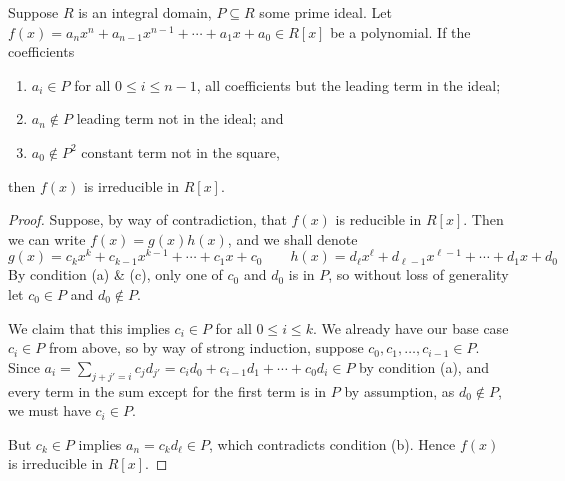 \begin{theorem}\label{thm:eisenstein-criterion}
    Suppose \(R\) is an integral domain, \(P \subseteq R\) some prime ideal.
    Let \(f(x) = a_n x^n + a_{n-1}x^{n-1} + \cdots + a_1 x + a_0 \in R[x]\)
    be a polynomial.
    If the coefficients
    \begin{enumerate}[label={(\alph*)}, itemsep=0mm]
        \item \(a_i \in P\) for all \(0 \leq i \leq n-1\),
            all coefficients but the leading term in the ideal;
        \item \(a_n \notin P\) leading term not in the ideal; and
        \item \(a_0 \notin P^2\) constant term not in the square,
    \end{enumerate}
    then \(f(x)\) is irreducible in \(R[x]\).
\end{theorem}
\begin{proof}
    Suppose, by way of contradiction, that \(f(x)\) is reducible in \(R[x]\).
    Then we can write \(f(x) = g(x)h(x)\), and we shall denote
    \begin{equation*}
        g(x) = c_k x^k + c_{k-1}x^{k-1} + \cdots + c_1 x + c_0 \qquad
        h(x) = d_\ell x^\ell + d_{\ell-1}x^{\ell-1} + \cdots + d_1 x + d_0
    \end{equation*}
    By condition (a) \& (c),
    only one of \(c_0\) and \(d_0\) is in \(P\),
    so without loss of generality let \(c_0 \in P\) and \(d_0 \notin P\).

    We claim that this implies \(c_i \in P\) for all \(0 \leq i \leq k\).
    We already have our base case \(c_i \in P\) from above,
    so by way of strong induction,
    suppose \(c_0,c_1,\hdots,c_{i-1} \in P\).
    Since \(a_i = \sum_{j+j'=i} c_j d_{j'} = c_i d_0 + c_{i-1}d_1 + \cdots + c_0 d_i \in P\)
    by condition (a),
    and every term in the sum except for the first term is in \(P\) by assumption,
    as \(d_0 \notin P\), we must have \(c_i \in P\).

    But \(c_k \in P\) implies \(a_n = c_k d_\ell \in P\),
    which contradicts condition (b).
    Hence \(f(x)\) is irreducible in \(R[x]\).
\end{proof}

